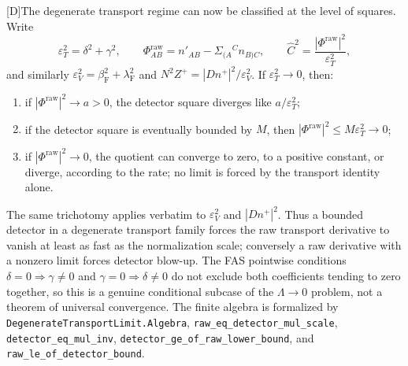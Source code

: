 \documentclass[11pt,a4paper]{article}
\newcommand{\statusD}{\textsf{[D]}}
\begin{document}
\statusD The degenerate transport regime can now be classified at the level of squares.  Write
\[
  \varepsilon_T^2=\delta^2+\gamma^2,
  \qquad
  \Phi^{\mathrm{raw}}_{AB}=n'_{AB}-\Sigma_{(A}{}^C n_{B)C},
  \qquad
  \hat C^2=\frac{|\Phi^{\mathrm{raw}}|^2}{\varepsilon_T^2},
\]
and similarly \(\varepsilon_V^2=\beta_{\mathrm F}^2+\lambda_{\mathrm F}^2\) and \(N^2Z^+=|Dn^+|^2/\varepsilon_V^2\).  If \(\varepsilon_T^2\to0\), then:
\begin{enumerate}
  \item if \(|\Phi^{\mathrm{raw}}|^2\to a>0\), the detector square diverges like \(a/\varepsilon_T^2\);
  \item if the detector square is eventually bounded by \(M\), then \(|\Phi^{\mathrm{raw}}|^2\le M\varepsilon_T^2\to0\);
  \item if \(|\Phi^{\mathrm{raw}}|^2\to0\), the quotient can converge to zero, to a positive constant, or diverge, according to the rate; no limit is forced by the transport identity alone.
\end{enumerate}
The same trichotomy applies verbatim to \(\varepsilon_V^2\) and \(|Dn^+|^2\).  Thus a bounded detector in a degenerate transport family forces the raw transport derivative to vanish at least as fast as the normalization scale; conversely a raw derivative with a nonzero limit forces detector blow-up.  The FAS pointwise conditions \(\delta=0\Rightarrow\gamma\neq0\) and \(\gamma=0\Rightarrow\delta\neq0\) do not exclude both coefficients tending to zero together, so this is a genuine conditional subcase of the \(\Lambda\to0\) problem, not a theorem of universal convergence.  The finite algebra is formalized by \texttt{DegenerateTransportLimit.Algebra}, \texttt{raw\_eq\_detector\_mul\_scale}, \texttt{detector\_eq\_mul\_inv}, \texttt{detector\_ge\_of\_raw\_lower\_bound}, and \texttt{raw\_le\_of\_detector\_bound}.
\end{document}
